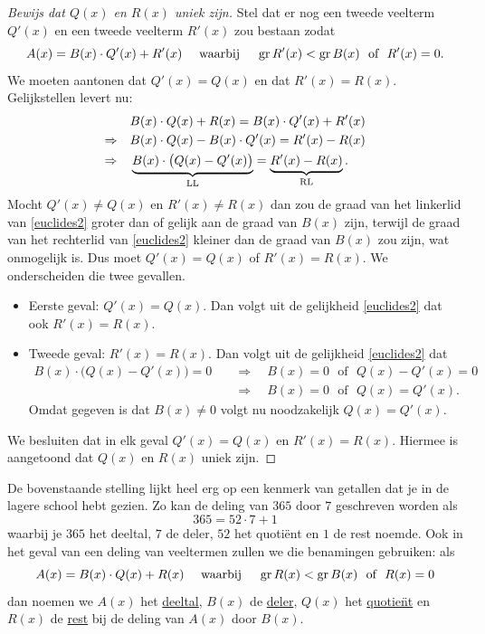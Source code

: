 \documentclass{ximera}
\begin{document}
\clearpage

\begin{proof}[Bewijs dat $Q(x)$ en $R(x)$ uniek zijn] Stel dat er nog een tweede veelterm $Q'(x)$ en een tweede veelterm $R'(x)$ zou bestaan zodat
\[
A(x) = B(x)\cdot Q'(x) + R'(x) \quad \text{ waarbij } \quad \operatorname{gr} R'(x) < \operatorname{gr} B(x) \,\, \text{ of } \,\, R'(x) = 0.
\]
We moeten aantonen dat $Q'(x) = Q(x)$ en dat $R'(x) = R(x)$. Gelijkstellen levert nu:
\begin{align}
& B(x) \cdot Q(x) + R(x) = B(x) \cdot Q'(x) + R'(x) \notag \\
\Rightarrow \quad & B(x) \cdot Q(x) - B(x) \cdot Q'(x) = R'(x) - R(x) \notag \\
\Rightarrow \quad & \underbrace{B(x) \cdot \bigl(Q(x) - Q'(x)\bigr)}_{\text{LL}} = \underbrace{R'(x) - R(x)}_{\text{RL}}. \label{euclides2}
\end{align}
Mocht $Q'(x) \neq Q(x)$ en $R'(x) \neq R(x)$ dan zou de graad van het linkerlid van \eqref{euclides2} groter dan of gelijk aan de graad van $B(x)$ zijn, terwijl de graad van het rechterlid van \eqref{euclides2} kleiner dan de graad van $B(x)$ zou zijn, wat onmogelijk is. Dus moet $Q'(x) = Q(x)$ of $R'(x) = R(x)$. We onderscheiden die twee gevallen.
\begin{itemize}
\item[]
Eerste geval: $Q'(x) = Q(x)$. Dan volgt uit de gelijkheid \eqref{euclides2} dat ook $R'(x) = R(x)$.  
\item[]
Tweede geval: $R'(x) = R(x)$. Dan volgt uit de gelijkheid \eqref{euclides2} dat
\begin{align*}
B(x) \cdot \bigl(Q(x) - Q'(x)\bigr) = 0 \quad 
& \Rightarrow \quad B(x) = 0 \,\, \text{ of } \,\, Q(x) - Q'(x) = 0 \\
& \Rightarrow \quad B(x) = 0 \,\, \text{ of } \,\, Q(x) = Q'(x). 
\end{align*}
Omdat gegeven is dat $B(x) \neq 0$ volgt nu noodzakelijk $Q(x) = Q'(x)$.
\end{itemize}
We besluiten dat in elk geval $Q'(x) = Q(x)$ en $R'(x) = R(x)$. Hiermee is aangetoond dat $Q(x)$ en $R(x)$ uniek zijn. 
\end{proof}

De bovenstaande stelling lijkt heel erg op een kenmerk van getallen dat je in de lagere school hebt gezien. Zo kan de deling van $365$ door $7$ geschreven worden als
\[
365 = 52 \cdot 7 + 1
\]
waarbij je $365$ het deeltal, $7$ de deler, $52$ het quoti\"ent en $1$ de rest noemde. Ook in het geval van een deling van veeltermen zullen we die benamingen gebruiken: als
\[
A(x) = B(x)\cdot Q(x) + R(x) \quad \text{ waarbij } \quad \operatorname{gr} R(x) < \operatorname{gr} B(x) \,\, \text{ of } \,\, R(x) = 0
\]
dan noemen we $A(x)$ het \underline{deeltal}, $B(x)$ de \underline{deler}, $Q(x)$ het \underline{quotie\"nt} en $R(x)$ de \underline{rest} bij de deling van $A(x)$ door $B(x)$. 
\end{document}
